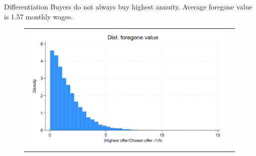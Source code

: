 \documentclass[10pt,aspectratio=169]{beamer}
\begin{document}
\begin{frame}{Differentiation}\label{slide:fig2}    
Buyers do not always buy highest annuity. Average foregone value is 1.57 monthly wages.
\begin{figure}[H]
\centering{}%
\begin{tabular}{cc}
\includegraphics[scale=0.25]{../figures/IE3/IE3_foregone_hist.png}
\end{tabular}
\end{figure}
\hyperlink{slide:Descriptive_evidence}{}
\end{frame}





\end{document}
